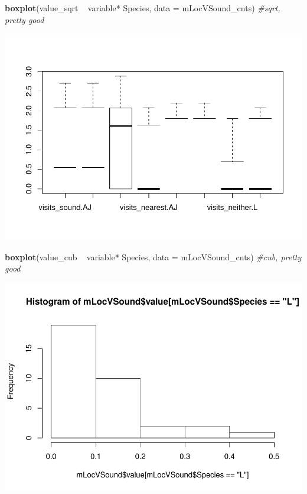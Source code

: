 \documentclass[]{article}
\newenvironment{Shaded}{\begin{snugshade}}{\end{snugshade}}
\newcommand{\KeywordTok}[1]{\textcolor[rgb]{0.13,0.29,0.53}{\textbf{{#1}}}}
\newcommand{\DataTypeTok}[1]{\textcolor[rgb]{0.13,0.29,0.53}{{#1}}}
\newcommand{\StringTok}[1]{\textcolor[rgb]{0.31,0.60,0.02}{{#1}}}
\newcommand{\CommentTok}[1]{\textcolor[rgb]{0.56,0.35,0.01}{\textit{{#1}}}}
\newcommand{\NormalTok}[1]{{#1}}
\begin{document}
\begin{Shaded}
\begin{Highlighting}[]
\KeywordTok{boxplot}\NormalTok{(value_sqrt ~}\StringTok{  }\NormalTok{variable*}\StringTok{ }\NormalTok{Species, }\DataTypeTok{data =} \NormalTok{mLocVSound_cnts) }\CommentTok{#sqrt, pretty good}
\end{Highlighting}
\end{Shaded}

\includegraphics{Sensory_learning_files/figure-latex/unnamed-chunk-17-6.pdf}

\begin{Shaded}
\begin{Highlighting}[]
\KeywordTok{boxplot}\NormalTok{(value_cub ~}\StringTok{  }\NormalTok{variable*}\StringTok{ }\NormalTok{Species, }\DataTypeTok{data =} \NormalTok{mLocVSound_cnts) }\CommentTok{#cub, pretty good}
\end{Highlighting}
\end{Shaded}

\includegraphics{Sensory_learning_files/figure-latex/unnamed-chunk-17-7.pdf}
\end{document}
